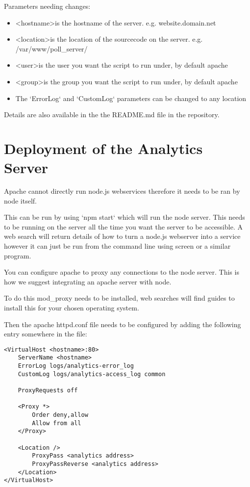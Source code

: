 Parameters needing changes:

\begin{itemize}
\item \textless hostname\textgreater is the hostname of the server. e.g. website.domain.net
\item \textless location\textgreater is the location of the sourcecode on the server. e.g. /var/www/poll\_server/
\item \textless user\textgreater is the user you want the script to run under, by default apache
\item \textless group\textgreater is the group you want the script to run under, by default apache
\item The `ErrorLog` and `CustomLog` parameters can be changed to any location

\end{itemize}

Details are also available in the the README.md file in the repository.

\chapter{Deployment of the Analytics Server} \label{Chapter:Deployment Analytics Server}

Apache cannot directly run node.js webservices therefore it needs to be ran by node itself.

This can be run by using `npm start` which will run the node server. This needs to be running on the server all the time you want the server to be accessible.
A web search will return details of how to turn a node.js webserver into a service however it can just be run from the command line using screen or a similar program.

You can configure apache to proxy any connections to the node server. This is how we suggest integrating an apache server with node.

To do this mod\_proxy needs to be installed, web searches will find guides to install this for your chosen operating system.

Then the apache httpd.conf file needs to be configured by adding the following entry somewhere in the file:

\begin{lstlisting}
<VirtualHost <hostname>:80>
	ServerName <hostname>
	ErrorLog logs/analytics-error_log
	CustomLog logs/analytics-access_log common

	ProxyRequests off
	
	<Proxy *>
		Order deny,allow
		Allow from all
	</Proxy>

	<Location />
		ProxyPass <analytics address>
		ProxyPassReverse <analytics address>
	</Location>
</VirtualHost>
\end{lstlisting}

